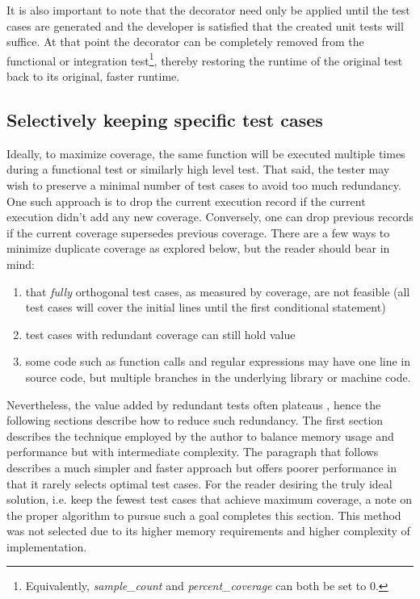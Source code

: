 It is also important to note that the decorator need only be applied until the 
test cases are generated and the developer is satisfied that the created unit
tests will suffice.  At that point the decorator can be completely removed
from the functional or integration test\footnote{Equivalently, 
\textit{sample\_count} and \textit{percent\_coverage} can both be set to 0.}, 
thereby restoring the runtime of
the original test back to its original, faster runtime.  

\subsection{Selectively keeping specific test cases}\label{sec:tuning-1}
Ideally, to maximize coverage, the same function will be executed multiple 
times during a functional test or similarly high level test.  That said, 
the tester may wish to preserve 
a minimal number of test cases to avoid too much redundancy.  
%
One such approach is to drop the current execution
record if the current execution didn’t add any new coverage.  
Conversely, one can drop previous records if the current coverage supersedes
previous coverage.
There are a few ways to minimize duplicate coverage as explored below, 
but the reader should bear in mind:

\begin{enumerate}
  \item that \textit{fully} orthogonal test cases, as measured by coverage, are not feasible 
  (all test cases will cover the initial lines until the first conditional statement) 
  \item test cases with redundant coverage can still hold value
  \item some code such as function calls and regular expressions may have one 
  line in source code, but multiple branches in the underlying library or machine code.
\end{enumerate}

Nevertheless, the value added by redundant tests often plateaus 
\cite{lemieux2023codamosa}, hence the following sections
describe how to reduce such redundancy.  The first section describes
the technique employed by the author to balance memory usage and performance but
with intermediate complexity. The paragraph that follows describes a much simpler and faster
approach but offers poorer performance in that it rarely selects optimal test 
cases.  For the reader desiring the truly ideal solution, i.e. keep the fewest test cases that achieve
maximum coverage, a note on the proper algorithm to pursue such a goal completes
this section. This method was not selected due to its higher memory
requirements and higher complexity of implementation.
 
